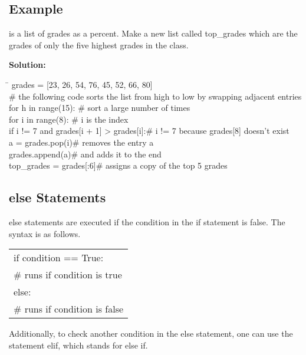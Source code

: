 \documentclass{article}
\newcommand{\icode}[1]{{\ttfamily #1}}
\newenvironment{code}{\begin{tcolorbox}\ttfamily}{\end{tcolorbox}}
\begin{document}
\subsection{Example}
\noindent \icode{grades} is a list of grades as a percent. Make a new list called \icode{top\_grades} which are the grades of only the five highest grades in the class.
\vspace{1 mm}

\noindent\textbf{Solution:}
\begin{code}
	\begin{tabbing}
		\hspace{3.5 in}\=\hspace{3.25 in} \kill
		grades = [23, 26, 54, 76, 45, 52, 66, 80]\\
		\# the following code sorts the list from high to low by swapping adjacent entries\\
		for h in range(15): \>\# sort a large number of times\\
		\hspace{2 em}for i in range(8): \> \# i is the index\\
		\hspace{4 em}if i != 7 and grades[i + 1] > grades[i]:\>\# i != 7 because grades[8] doesn't exist\\
		\hspace{6 em}a = grades.pop(i)\>\# removes the entry a\\
		\hspace{6 em}grades.append(a)\>\# and adds it to the end\\
		top\_grades = grades[:6]\>\# assigns a copy of the top 5 grades
	\end{tabbing}
\end{code}
\vspace{.5 cm}


\subsection{\icode{else} Statements}
\icode{else} statements are executed if the condition in the \icode{if} statement is false. The syntax is as follows.

\begin{center} \ttfamily
	\begin{tabular}{|l}
		if condition == True:\\
		\hspace{2 em}\# runs if condition is true\\
		else:\\
		\hspace{2 em}\# runs if condition is false
	\end{tabular}
\end{center}
Additionally, to check another condition in the else statement, one can use the statement \icode{elif}, which stands for else if.
\end{document}
